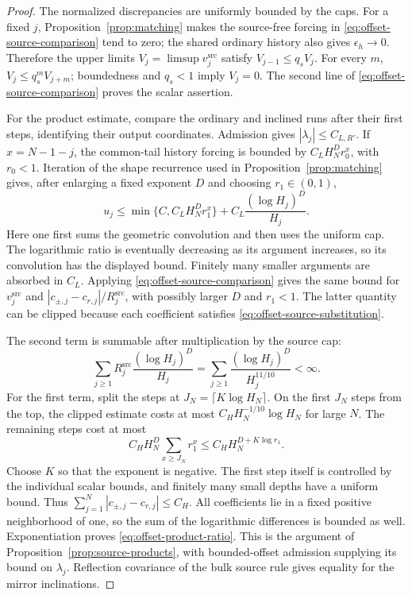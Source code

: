 \begin{proof}
The normalized discrepancies are uniformly bounded by the caps.
For a fixed $j$, Proposition~\ref{prop:matching} makes the source-free
forcing in \eqref{eq:offset-source-comparison} tend to zero; the shared
ordinary history also gives $\epsilon_h\to0$.  Therefore the upper
limits $V_j=\limsup v_j^{\mathrm{src}}$ satisfy
$V_{j-1}\le q_sV_j$.  For every $m$, $V_j\le q_s^mV_{j+m}$;
boundedness and $q_s<1$ imply $V_j=0$.  The second line of
\eqref{eq:offset-source-comparison} proves the scalar assertion.

For the product estimate, compare the ordinary and inclined runs after
their first steps, identifying their output coordinates.  Admission
gives $|\lambda_j|\le C_{L,R'}$.  If $x=N-1-j$, the common-tail history
forcing is bounded by $C_LH_N^D r_0^x$, with $r_0<1$.  Iteration of the
shape recurrence used in Proposition~\ref{prop:matching} gives, after
enlarging a fixed exponent $D$ and choosing $r_1\in(0,1)$,
\begin{equation}
 u_j\le \min\{C,C_LH_N^D r_1^x\}
             +C_L\frac{(\log H_j)^D}{H_j}.
 \label{eq:offset-clipped-comparison}
\end{equation}
Here one first sums the geometric convolution and then uses the uniform
cap.  The logarithmic ratio is eventually decreasing as its argument
increases, so its convolution has the displayed bound.  Finitely many
smaller arguments are absorbed in $C_L$.
Applying \eqref{eq:offset-source-comparison} gives the same bound for
$v_j^{\mathrm{src}}$ and
$|c_{\pm,j}-c_{r,j}|/R_j^{\mathrm{src}}$, with possibly larger $D$ and
$r_1<1$.  The latter quantity can be clipped because each coefficient
satisfies \eqref{eq:offset-source-substitution}.

The second term is summable after multiplication by the source cap:
\[
 \sum_{j\ge1}R_j^{\mathrm{src}}
               \frac{(\log H_j)^D}{H_j}
 =\sum_{j\ge1}\frac{(\log H_j)^D}{H_j^{11/10}}<\infty.
\]
For the first term, split the steps at
$J_N=\lceil K\log H_N\rceil$.  On the first $J_N$ steps from the top,
the clipped estimate costs at most
$C_H H_N^{-1/10}\log H_N$ for large $N$.  The remaining steps cost at
most
\[
 C_H H_N^D\sum_{x\ge J_N}r_1^x
 \le C_H H_N^{D+K\log r_1}.
\]
Choose $K$ so that the exponent is negative.  The first step itself is
controlled by the individual scalar bounds, and finitely many small
depths have a uniform bound.  Thus
$\sum_{j=1}^N|c_{\pm,j}-c_{r,j}|\le C_H$.
All coefficients lie in a fixed positive neighborhood of one, so the
sum of the logarithmic differences is bounded as well.  Exponentiation
proves \eqref{eq:offset-product-ratio}.  This is the argument of
Proposition~\ref{prop:source-products}, with bounded-offset admission
supplying its bound on $\lambda_j$.  Reflection covariance of the
bulk source rule gives equality for the mirror inclinations.
\end{proof}

